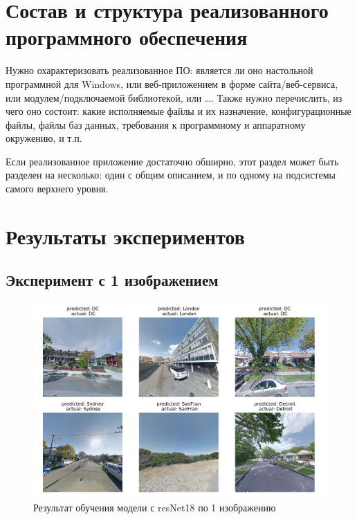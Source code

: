 \section{Состав и структура реализованного программного обеспечения}

Нужно охарактеризовать реализованное ПО: является ли оно настольной программной для Windows, или веб-приложением в форме сайта/веб-сервиса, или модулем/подключаемой библиотекой, или \dots. Также нужно перечислить, из чего оно состоит: какие исполняемые файлы и их назначение, конфигурационные файлы, файлы баз данных, требования к программному и аппаратному окружению, и т.п.

Если реализованное приложение достаточно обширно, этот раздел может быть
разделен на несколько: один с общим описанием, и по одному на подсистемы самого
верхнего уровня.

\section{Результаты экспериментов}

\subsection{Эксперимент с 1 изображением}

\begin{figure}
	\centering
	\includegraphics[width=0.9\linewidth]{img/res1im}
	\caption{Результат обучения модели с resNet18 по 1 изображению}
	\label{fig:res1im}
\end{figure}


